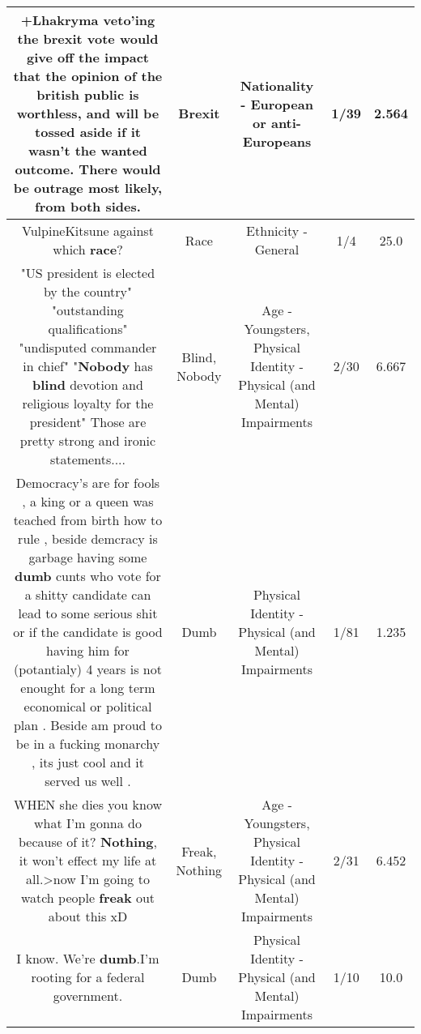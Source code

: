 \documentclass[11pt]{article}
\newlength\mylength
\begin{document}
\begin{center}
\begin{longtable}{|C{.65\mylength}|C{.30\mylength}|C{.12\mylength}|C{.12\mylength}|C{.12\mylength}|}
  \small +Lhakryma veto'ing the \textbf{brexit} vote would give off the impact that the opinion of the british public is worthless, and will be tossed aside if it wasn't the wanted outcome. There would be outrage most likely, from both sides.\normalsize   & Brexit & Nationality - European or anti-Europeans & 1/39 & 2.564 \\  \hline
  \small VulpineKitsune against which \textbf{race}?\normalsize   & Race & Ethnicity - General & 1/4 & 25.0 \\  \hline
  \small "US president is elected by the country" "outstanding qualifications" "undisputed commander in chief"  "\textbf{Nobody} has \textbf{blind} devotion and religious loyalty for the president" Those are pretty strong and ironic statements....\normalsize   & Blind, Nobody & Age - Youngsters, Physical Identity - Physical (and Mental) Impairments & 2/30 & 6.667 \\  \hline
  \small Democracy's are for fools , a king or a queen was teached from birth how to rule , beside demcracy is garbage having some \textbf{dumb} cunts who vote for a shitty candidate can lead to some serious shit or if the candidate is good having  him for (potantialy) 4 years is not enought for a long term economical or political plan . Beside am proud to be in a fucking monarchy , its just cool and it served us well .\normalsize   & Dumb & Physical Identity - Physical (and Mental) Impairments & 1/81 & 1.235 \\  \hline
  \small WHEN she dies you know what I'm gonna do because of it? \textbf{Nothing}, it won't effect my life at all.>now I'm going to watch people \textbf{freak} out about this xD\normalsize   & Freak, Nothing & Age - Youngsters, Physical Identity - Physical (and Mental) Impairments & 2/31 & 6.452 \\  \hline
  \small I know. We're \textbf{dumb}.I'm rooting for a federal government.\normalsize   & Dumb & Physical Identity - Physical (and Mental) Impairments & 1/10 & 10.0 \\  \hline

\end{longtable}
\end{center}
\end{document}
